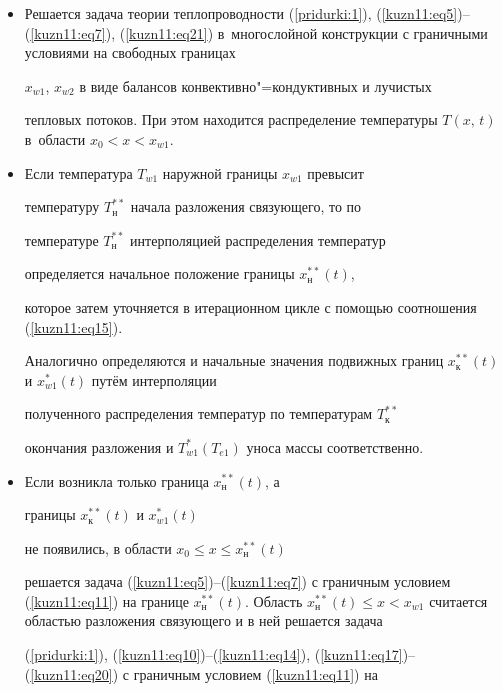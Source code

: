 \begin{itemize}

\item[1.] Решается задача теории теплопроводности (\ref{pridurki:1}), (\ref{kuzn11:eq5})--(\ref{kuzn11:eq7}), (\ref{kuzn11:eq21}) в~многослойной конструкции с граничными условиями на свободных границах

$x_{w1}$, $x_{w2}$ в виде балансов конвективно"=кондуктивных и лучистых

тепловых потоков. При этом находится распределение температуры $T(x,\,t)$ в~области $x_0 <x<x_{w1}$.



\item[2.] Если температура $T_{w1} $ наружной границы $x_{w1} $ превысит

температуру $T_\text{н}^{\ast \ast } $ начала разложения связующего, то по

температуре $T_\text{н}^{\ast \ast } $ интерполяцией распределения температур

определяется начальное положение границы $x_\text{н}^{\ast \ast } ( t )$,

которое затем уточняется в итерационном цикле с помощью соотношения (\ref{kuzn11:eq15}).

Аналогично определяются и начальные значения подвижных границ $x_\text{к}^{\ast

\ast} ( t )$ и $x_{w1}^\ast (t)$ путём интерполяции

полученного распределения температур по температурам $T_\text{к}^{\ast \ast }$

окончания разложения и $T_{w1}^\ast ( T_{e1})$ уноса массы соответственно.



\item[3.] Если возникла только граница $x_\text{н}^{\ast \ast}( t )$, а

границы $x_\text{к}^{\ast \ast } ( t )$ и $x_{w1}^\ast ( t)$

не появились, в области $x_0 \le x\le x_\text{н}^{\ast \ast } ( t )$

решается задача (\ref{kuzn11:eq5})--(\ref{kuzn11:eq7}) с граничным условием (\ref{kuzn11:eq11}) на границе $x_\text{н}^{\ast

\ast} ( t )$. Область $x_\text{н}^{\ast \ast} (t) \le x<x_{w1}$ считается областью разложения связующего и в ней решается задача

(\ref{pridurki:1}), (\ref{kuzn11:eq10})--(\ref{kuzn11:eq14}), (\ref{kuzn11:eq17})--(\ref{kuzn11:eq20}) с граничным условием (\ref{kuzn11:eq11}) на


\end{itemize}
